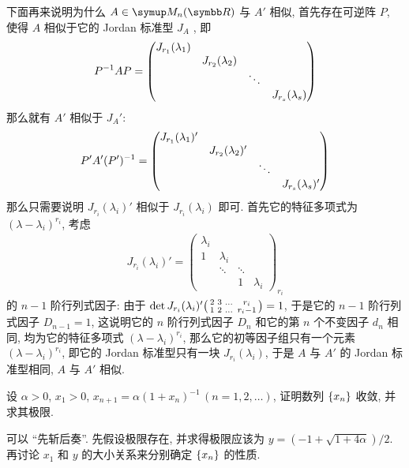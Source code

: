 \begin{exercise}[resume=exer]
\begin{answer}
            下面再来说明为什么 $ A \in \MM $ 与 $ A' $ 相似, 首先存在可逆阵 $ P $, 使得 $ A $ 相似于它的 Jordan 标准型 $ J_{A} $ , 即
            \begin{align*}
                P^{-1}AP = \mqty(\dmat{J_{r_{1}}(\lambda_{1}), J_{r_{2}}(\lambda_{2}), \ddots, J_{r_{s}}(\lambda_{s})})
            \end{align*}
            那么就有 $ A' $ 相似于 $ J_{A}' $: 
            \begin{align*}
                P'A'(P')^{-1} = \mqty(\dmat{J_{r_{1}}(\lambda_{1})', J_{r_{2}}(\lambda_{2})', \ddots, J_{r_{s}}(\lambda_{s})'})
            \end{align*}
            那么只需要说明 $ J_{r_{i}}(\lambda_{i})' $ 相似于 $ J_{r_{i}}(\lambda_{i}) $ 即可. 首先它的特征多项式为 $ (\lambda - \lambda_{i})^{r_{i}} $, 考虑
            \begin{align*}
                J_{r_{i}}(\lambda_{i})' = \begin{pmatrix}
                    \lambda_{i} & & & \\
                    1 & \lambda_{i} & & \\
                    &  \ddots & \ddots & \\
                    & & 1 & \lambda_{i}
                \end{pmatrix}_{r_{i}}
            \end{align*}
            的 $ n-1 $ 阶行列式因子: 由于 $ \det J_{r_{i}}(\lambda_{i})'\smqty(2 & 3 & \dots & r_{i} \\ 1 & 2 & \dots & r_{i}-1) = 1 $, 于是它的 $ n - 1 $ 阶行列式因子 $ D_{n-1} = 1 $, 这说明它的 $ n $ 阶行列式因子 $ D_{n} $ 和它的第 $ n $ 个不变因子 $ d_{n} $ 相同, 均为它的特征多项式 $ (\lambda - \lambda_{i})^{r_{i}} $, 那么它的初等因子组只有一个元素 $ (\lambda - \lambda_{i})^{r_{i}} $, 即它的 Jordan 标准型只有一块 $ J_{r_{i}}(\lambda_{i}) $, 于是 $ A $ 与 $ A' $ 的 Jordan 标准型相同, $ A $ 与 $ A' $ 相似. 
        \end{answer}
        \item 设 $ \alpha > 0 $, $ x_{1} > 0 $, $ x_{n + 1} = \alpha(1 + x_{n})^{-1}\,(n = 1, 2, \dots) $, 证明数列 $ \qty{x_{n}} $ 收敛, 并求其极限.
        \begin{hint}
            可以 ``先斩后奏''. 先假设极限存在, 并求得极限应该为 $ y = (-1 + \sqrt{1 + 4\alpha})/2 $. 再讨论 $ x_{1} $ 和 $ y $ 的大小关系来分别确定 $ \qty{x_{n}} $ 的性质. 
        \end{hint}
        \begin{answer}

\end{answer}
\end{exercise}
